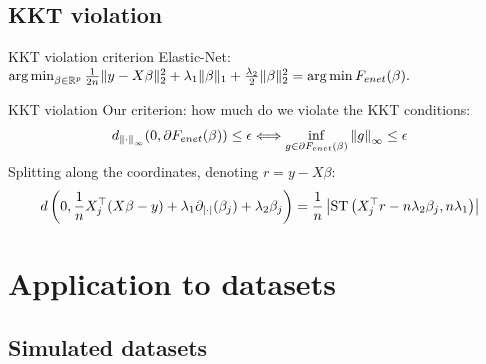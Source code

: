 \documentclass[10pt,aspectratio=43]{beamer}
\begin{document}
\subsection{KKT violation}
\begin{frame}{KKT violation criterion}
Elastic-Net: $\mathop{\mathrm{arg\,min}}_{\beta\in\mathbb{R}^p}
        \frac{1}{2n} \|y - X\beta\|^2_2 + \lambda_1 \|\beta\|_1 +
        \frac{\lambda_2}{2}\|\beta\|^2_2 = \mathop{\mathrm{arg\,min}} F_{enet}(\beta).$

\begin{block}{KKT violation}
Our criterion: how much do we violate the KKT conditions:
\begin{align*}
    d_{\left \lVert \cdot \right \rVert_\infty}(0, \partial F_{enet}(\beta)) \leq \epsilon
    \Longleftrightarrow \inf_{g\in\partial F_{enet}(\beta)}\left \lVert g \right \rVert_\infty
    \leq \epsilon
\end{align*}
Splitting along the coordinates, denoting $r=y-X\beta$:
\begin{align*}
d\left(0, \frac{1}{n}X_j^\top(X\beta - y)
+ \lambda_1 \partial_{\left \vert \cdot \right \vert}(\beta_j)
+ \lambda_2 \beta_j  \right) =
\frac{1}{n} \left| \mathrm{ST}\left( X_j^\top r - n \lambda_2 \beta_j
, n\lambda_1 \right) \right|
\end{align*}
\end{block}
\end{frame}

\section{Application to datasets}
\label{sec:application_to_datasets}

\subsection{Simulated datasets}
\label{subsec:simulated_datasets}


\end{document}
